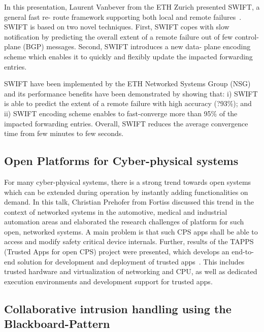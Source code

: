In this presentation, Laurent Vanbever from the ETH Zurich presented SWIFT, a
general fast re- route framework supporting both local and remote
failures~\cite{}. SWIFT is based on two novel techniques. First, SWIFT copes
with slow notification by predicting the overall extent of a remote failure
out of few control-plane (BGP) messages. Second, SWIFT introduces a new data-
plane encoding scheme which enables it to quickly and flexibly update the
impacted forwarding entries.

SWIFT have been implemented by the ETH Networked Systems Group (NSG) and its
performance benefits have been demonstrated by showing that: i) SWIFT is able
to predict the extent of a remote failure with high accuracy (?93\%); and ii)
SWIFT encoding scheme enables to fast-converge more than 95\% of the impacted
forwarding entries. Overall, SWIFT reduces the average convergence time from
few minutes to few seconds.


\subsection{Open Platforms for Cyber-physical systems}

For many cyber-physical systems, there is a strong trend towards open systems
which can be extended during operation by instantly adding functionalities on
demand. In this talk, Christian Prehofer from Fortiss discussed this trend in
the context of networked systems in the automotive, medical and industrial
automation areas and elaborated the research challenges of platform for such
open, networked systems. A main problem is that such CPS apps shall be able to
access and modify safety critical device internals. Further, results of the
TAPPS (Trusted Apps for open CPS) project were presented, which  develops an
end-to-end solution for development and deployment of trusted
apps~\cite{Prehofer2016}. This includes trusted hardware and virtualization of
networking and CPU, as well as dedicated execution environments and
development support for trusted apps.


\subsection{Collaborative intrusion handling using the Blackboard-Pattern}

